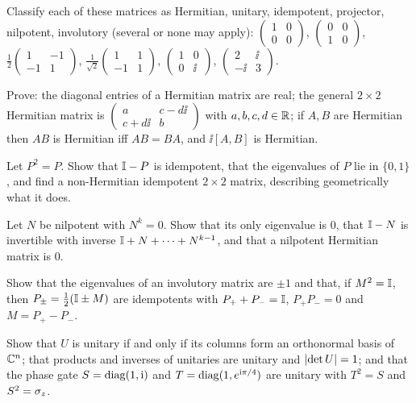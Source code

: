 \begin{exerciseset}
   Classify each of these matrices as Hermitian, unitary, idempotent, projector, nilpotent, involutory (several or none may apply): $\begin{pmatrix}1&0\\0&0\end{pmatrix}$, $\begin{pmatrix}0&0\\1&0\end{pmatrix}$, $\tfrac12\begin{pmatrix}1&-1\\-1&1\end{pmatrix}$, $\tfrac1{\sqrt2}\begin{pmatrix}1&1\\-1&1\end{pmatrix}$, $\begin{pmatrix}1&0\\0&\ii\end{pmatrix}$, $\begin{pmatrix}2&\ii\\-\ii&3\end{pmatrix}$.

   Prove: the diagonal entries of a Hermitian matrix are real; the general $2\times2$ Hermitian matrix is $\begin{pmatrix}a&c-d\ii\\c+d\ii&b\end{pmatrix}$ with $a,b,c,d\in\mathbb{R}$; if $A,B$ are Hermitian then $AB$ is Hermitian iff $AB=BA$, and $\ii[A,B]$ is Hermitian.

   Let $P^2=P$. Show that $\mathbb{I}-P$ is idempotent, that the eigenvalues of $P$ lie in $\{0,1\}$, and find a non-Hermitian idempotent $2\times2$ matrix, describing geometrically what it does.

   Let $N$ be nilpotent with $N^k=0$. Show that its only eigenvalue is $0$, that $\mathbb{I}-N$ is invertible with inverse $\mathbb{I}+N+\dots+N^{k-1}$, and that a nilpotent Hermitian matrix is $0$.

   Show that the eigenvalues of an involutory matrix are $\pm1$ and that, if $M^2=\mathbb{I}$, then $P_\pm=\tfrac12(\mathbb{I}\pm M)$ are idempotents with $P_++P_-=\mathbb{I}$, $P_+P_-=0$ and $M=P_+-P_-$.

   Show that $U$ is unitary if and only if its columns form an orthonormal basis of $\mathbb{C}^n$; that products and inverses of unitaries are unitary and $\left|\det U\right|=1$; and that the phase gate $S=\operatorname{diag}(1,\mathrm{i})$ and $T=\operatorname{diag}(1,e^{\mathrm{i}\pi/4})$ are unitary with $T^2=S$ and $S^2=\sigma_z$.


\end{exerciseset}
